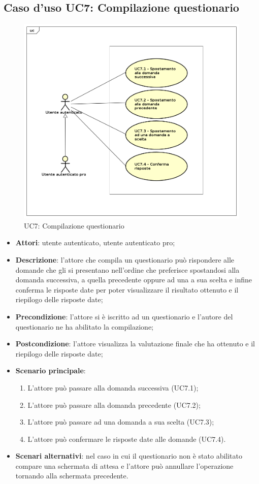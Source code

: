 \newpage
\subsection{Caso d'uso UC7: Compilazione questionario}
\label{UC7}
\begin{figure}[h]
\centering
\includegraphics[scale=0.5,keepaspectratio]{UML/UC7.png}
\caption{UC7: Compilazione questionario}
\end{figure}
\FloatBarrier
\begin{itemize}
\item\textbf{Attori}: utente autenticato, utente autenticato pro;
\item\textbf{Descrizione}: l'attore che compila un questionario può rispondere alle domande che gli si presentano nell'ordine che preferisce spostandosi alla domanda successiva, a quella precedente oppure ad una a sua scelta e infine conferma le risposte date per poter visualizzare il risultato ottenuto e il riepilogo delle risposte date;
\item\textbf{Precondizione}: l'attore si è iscritto ad un questionario e l'autore del questionario ne ha abilitato la compilazione;
\item\textbf{Postcondizione}: l'attore visualizza la valutazione finale che ha ottenuto e il riepilogo delle risposte date;
\item\textbf{Scenario principale}:
\begin{enumerate}
\item L'attore può passare alla domanda successiva (UC7.1);
\item L'attore può passare alla domanda precedente (UC7.2);
\item L'attore può passare ad una domanda a sua scelta (UC7.3);
\item L'attore può confermare le risposte date alle domande (UC7.4).
\end{enumerate}
\item\textbf{Scenari alternativi}: nel caso in cui il questionario non è stato abilitato compare una schermata di attesa e l'attore può annullare l'operazione tornando alla schermata precedente.
\end{itemize}

